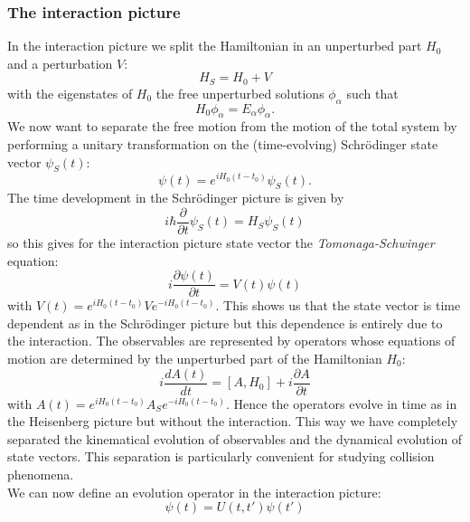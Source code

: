 \documentclass[11pt]{article}
\numberwithin{equation}{section}
\begin{document}
\subsubsection{The interaction picture}\label{sec:interactionpicture}
In the interaction picture we split the Hamiltonian in an unperturbed part $H_0$ and a perturbation $V$:
\begin{equation}
	H_S = H_0 + V
\end{equation}
with the eigenstates of $H_0$ the free unperturbed solutions $\phi_\alpha$ such that
\begin{equation}
	H_0 \phi_\alpha = E_\alpha\phi_\alpha.
\end{equation}
We now want to separate the free motion from the motion of the total system by performing a unitary transformation on the (time-evolving) Schr\"odinger state vector $\psi_S(t)$:
\begin{equation}
	\psi(t) = e^{iH_0(t-t_0)}\psi_S(t).
\end{equation}
The time development in the Schr\"odinger picture is given by
\begin{equation}
i\hbar \frac{\partial}{\partial t}\psi_S(t) = H_S\psi_S(t)
\end{equation}
so this gives for the interaction picture state vector the \emph{Tomonaga-Schwinger} equation:
\begin{equation}
	i \frac{\partial\psi(t)}{\partial t} = V(t)\psi(t)
\end{equation}
with $V(t) = e^{iH_0(t-t_0)}Ve^{-iH_0(t-t_0)}$. This shows us that the state vector is time dependent as in the Schr\"odinger picture but this dependence is entirely due to the interaction. The observables are represented by operators whose equations of motion are determined by the unperturbed part of the Hamiltonian $H_0$:
\begin{equation}
i \frac{dA(t)}{dt} = [A, H_0] + i \frac{\partial A}{\partial t}	
\end{equation}
with $A(t) = e^{iH_0(t-t_0)}A_Se^{-iH_0(t-t_0)}$. Hence the operators evolve in time as in the Heisenberg picture but without the interaction. This way we have completely separated the kinematical evolution of observables and the dynamical evolution of state vectors. This separation is particularly convenient for studying collision phenomena.\\
We can now define an evolution operator in the interaction picture:
\begin{equation}
\psi(t) = U(t,t')\psi(t')	
\end{equation}
\end{document}
